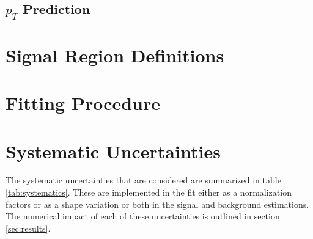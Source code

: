 \documentclass[NOTE, atlasdraft=true, texlive=2016, UKenglish]{\ATLASLATEXPATH atlasdoc}
\begin{document}
\subsection{$p_T$ Prediction}



\section{Signal Region Definitions}
\label{sec:signal_region}



\section{Fitting Procedure}
\label{sec:fit}




\section{Systematic Uncertainties}
\label{sec:sys}

The systematic uncertainties that are considered are summarized in table \ref{tab:systematics}. These are implemented in the fit either as a normalization factors or as a shape variation or both in the signal and background estimations. The numerical impact of each of these uncertainties is outlined in section \ref{sec:results}.
\end{document}
